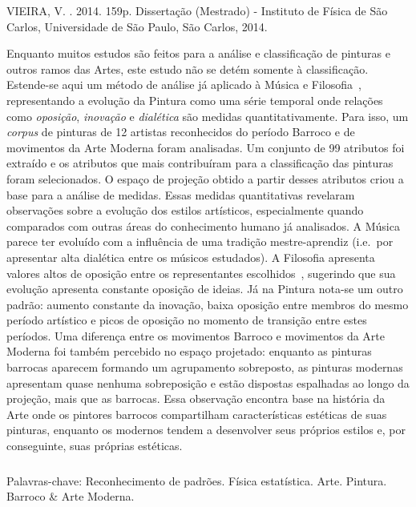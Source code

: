 \begin{resumo2}
\vspace{-10mm}
VIEIRA, V. \textbf{\ABNTtitulodata}. 2014. 159p. Dissertação (Mestrado) - Instituto de Física de São Carlos, Universidade de São Paulo, São Carlos, 2014.
\vspace{15mm}

Enquanto muitos estudos são feitos para a análise e classificação de
pinturas e outros ramos das Artes, este estudo não se detém somente à
classificação. Estende-se aqui um método de análise já aplicado à
Música e Filosofia~\cite{vieira}, representando a evolução da Pintura
como uma série temporal onde relações como \textit{oposição},
\textit{inovação} e \textit{dialética} são medidas
quantitativamente. Para isso, um \textit{corpus} de pinturas de 12
artistas reconhecidos do período Barroco e de movimentos da Arte
Moderna foram analisadas. Um conjunto de 99 atributos foi extraído e
os atributos que mais contribuíram para a classificação das pinturas
foram selecionados. O espaço de projeção obtido a partir desses
atributos criou a base para a análise de medidas. Essas medidas
quantitativas revelaram observações sobre a evolução dos estilos
artísticos, especialmente quando comparados com outras áreas do
conhecimento humano já analisados. A Música parece ter evoluído com a
influência de uma tradição mestre-aprendiz (i.e.\ por apresentar alta
dialética entre os músicos estudados). A Filosofia apresenta valores
altos de oposição entre os representantes escolhidos~\cite{vieira},
sugerindo que sua evolução apresenta constante oposição de ideias. Já
na Pintura nota-se um outro padrão: aumento constante da inovação,
baixa oposição entre membros do mesmo período artístico e picos de
oposição no momento de transição entre estes períodos. Uma diferença
entre os movimentos Barroco e movimentos da Arte Moderna foi também
percebido no espaço projetado: enquanto as pinturas barrocas aparecem
formando um agrupamento sobreposto, as pinturas modernas apresentam
quase nenhuma sobreposição e estão dispostas espalhadas ao longo da
projeção, mais que as barrocas. Essa observação encontra base na
história da Arte onde os pintores barrocos compartilham
características estéticas de suas pinturas, enquanto os modernos
tendem a desenvolver seus próprios estilos e, por conseguinte, suas
próprias estéticas.

$\phantom{linha em branco}$\\ Palavras-chave: Reconhecimento de
padrões. Física estatística. Arte. Pintura. Barroco \& Arte
Moderna. 

\end{resumo2}


